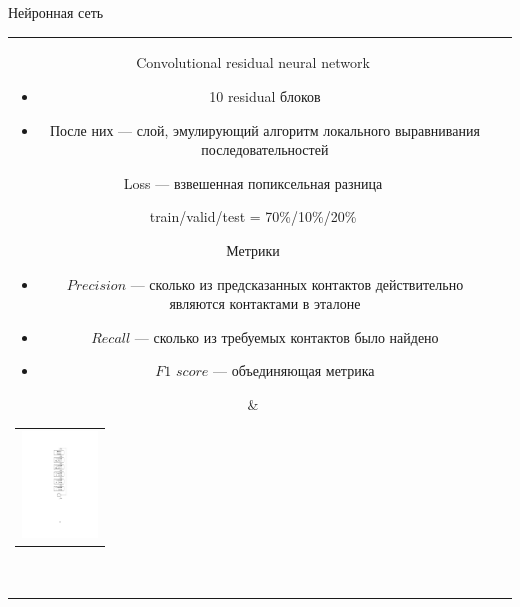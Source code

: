 \documentclass{beamer}
\begin{document}
\begin{frame}{Нейронная сеть}

\begin{tabular}{cl}  
    \parbox{0.75\linewidth}{
        \begin{itemize}
            \item Convolutional residual neural network
                \begin{itemize}
                    \item 10 residual блоков
                    \item После них --- слой, эмулирующий алгоритм локального выравнивания последовательностей
                \end{itemize}
            \item Loss --- взвешенная попиксельная разница
            \item train/valid/test = 70\%/10\%/20\%
              {\item Метрики
            \begin{itemize}
                \item $Precision$ --- сколько из предсказанных контактов действительно являются контактами в эталоне
                \item $Recall$ --- сколько из требуемых контактов было найдено
                \item $F1$ $score$ --- объединяющая метрика
            \end{itemize}}
        \end{itemize}
    }
    & \begin{tabular}{l}
        \includegraphics[width=2.0cm]{pics/res_unit.pdf}
    \end{tabular}  \\
\end{tabular}
    
\end{frame}
\end{document}
